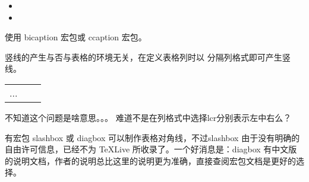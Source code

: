 
\begin{itemize}
  \item {}
  \item {}
\end{itemize}



使用 bicaption 宏包或 ccaption 宏包。



竖线的产生与否与表格的环境无关，在定义表格列时以 \textbar{}
分隔列格式即可产生竖线。
\begin{texinlist}
\begin{tabular}{l|c|r|}
  ...
\end{tabular}
\end{texinlist}







不知道这个问题是啥意思。。。
难道不是在列格式中选择lcr分别表示左中右么？


有宏包 slashbox 或 diagbox 可以制作表格对角线，不过slashbox
由于没有明确的自由许可信息，已经不为 TeXLive
所收录了。一个好消息是：diagbox
有中文版的说明文档，作者的说明总比这里的说明更为准确，直接查阅宏包文档是更好的选择。
